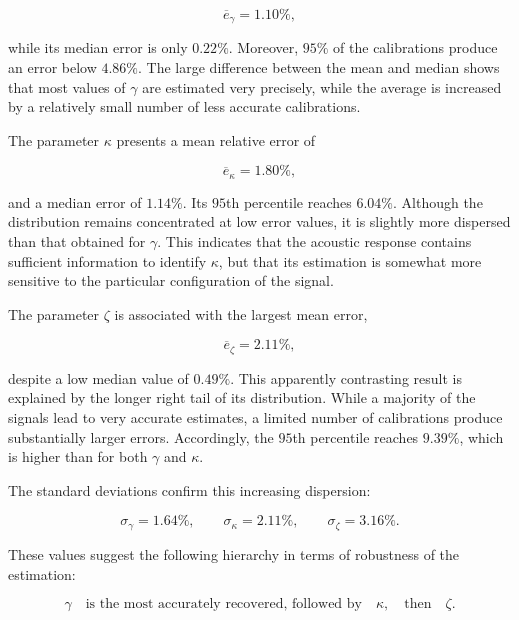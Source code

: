 \documentclass[11pt,a4paper]{report}
\theoremstyle{plain}
\theoremstyle{definition}
\begin{document}
\begin{equation}
\overline{e}_{\gamma}=1.10\%,
\end{equation}

while its median error is only $0.22\%$. Moreover, $95\%$ of the calibrations
produce an error below $4.86\%$. The large difference between the mean and
median shows that most values of $\gamma$ are estimated very precisely, while
the average is increased by a relatively small number of less accurate
calibrations.

The parameter $\kappa$ presents a mean relative error of

\begin{equation}
\overline{e}_{\kappa}=1.80\%,
\end{equation}

and a median error of $1.14\%$. Its $95$th percentile reaches $6.04\%$.
Although the distribution remains concentrated at low error values, it is
slightly more dispersed than that obtained for $\gamma$. This indicates that
the acoustic response contains sufficient information to identify $\kappa$,
but that its estimation is somewhat more sensitive to the particular
configuration of the signal.

The parameter $\zeta$ is associated with the largest mean error,

\begin{equation}
\overline{e}_{\zeta}=2.11\%,
\end{equation}

despite a low median value of $0.49\%$. This apparently contrasting result is
explained by the longer right tail of its distribution. While a majority of
the signals lead to very accurate estimates, a limited number of calibrations
produce substantially larger errors. Accordingly, the $95$th percentile
reaches $9.39\%$, which is higher than for both $\gamma$ and $\kappa$.

The standard deviations confirm this increasing dispersion:

\begin{equation}
\sigma_{\gamma}=1.64\%,
\qquad
\sigma_{\kappa}=2.11\%,
\qquad
\sigma_{\zeta}=3.16\%.
\label{eq:openwind_error_std}
\end{equation}

These values suggest the following hierarchy in terms of robustness of the
estimation:

\begin{equation}
\gamma
\quad \text{is the most accurately recovered, followed by} \quad
\kappa,
\quad \text{then} \quad
\zeta.
\end{equation}
\end{document}
